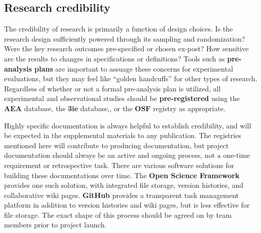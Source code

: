 \subsection{Research credibility}

The credibility of research is primarily a function of design choices.\cite{angrist2010credibility,ioannidis2005most}
Is the research design sufficiently powered through its sampling and randomization?
Were the key research outcomes pre-specified or chosen ex-post?
How sensitive are the results to changes in specifications or definitions?
Tools such as \textbf{pre-analysis plans}
are important to assuage these concerns for experimental evaluations,
but they may feel like ``golden handcuffs'' for other types of research.\cite{olken2015promises}
Regardless of whether or not a formal pre-analysis plan is utilized,
all experimental and observational studies should be \textbf{pre-registered}
using the \textbf{AEA} database,
the \textbf{3ie} database,,
or the \textbf{OSF} registry as appropriate.

Highly specific documentation is always helpful to establish credibility,
and will be expected in the supplemental materials to any publication.
The registries mentioned here will contribute to producing documentation,
but project documentation should always be an active and ongoing process,
not a one-time requirement or retrospective task.
There are various software solutions for building these documentations over time.
The \textbf{Open Science Framework} provides one such solution,
with integrated file storage, version histories, and collaborative wiki pages.
\textbf{GitHub} provides a transparent task management
platform
in addition to version histories and wiki pages, but is less effective for file storage.
The exact shape of this process should be agreed on by team members prior to project launch.

